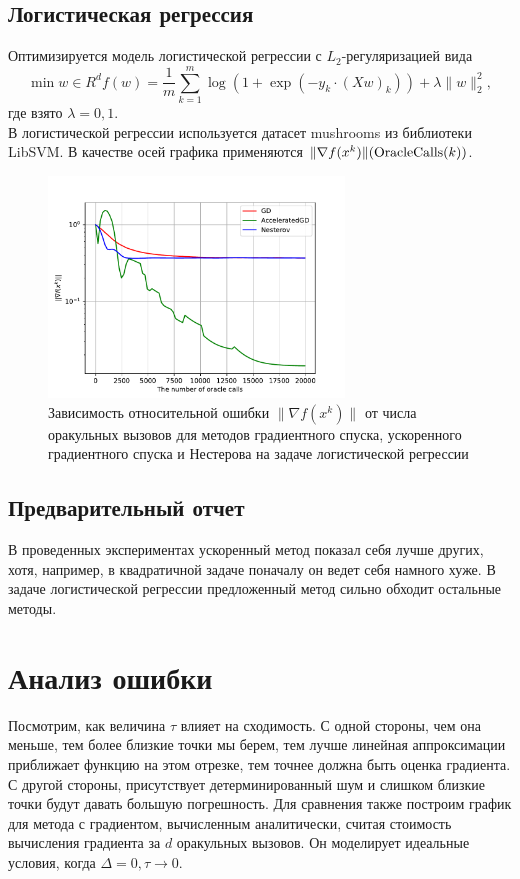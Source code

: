 \documentclass{article}
\begin{document}
\subsection{Логистическая регрессия}
Оптимизируется модель логистической регрессии с $L_2$-регуляризацией вида
\begin{equation}
 \min\limits{w \in R^d} f(w) = \frac{1}{m}\sum\limits_{k = 1}^m \log(1 + \exp(-y_k \cdot (Xw)_k)) + \lambda \|w\|_2^2,
\end{equation}
где взято $\lambda = 0,1$.\\
В логистической регрессии используется датасет mushrooms из библиотеки LibSVM. В качестве осей графика применяются $\|\nabla f(x^k)\| (\textnormal{OracleCalls}(k))$.
\begin{figure}[!htbp]
\centering
  \includegraphics[width=0.7\textwidth]{../figures/Non_stochastic_Logreg_GD_AGD_Nesterov_15_1e-07_1e-05.pdf}
 \caption{Зависимость относительной ошибки $\|\nabla f(x^k)\|$ от числа оракульных вызовов для методов градиентного спуска, ускоренного градиентного спуска и Нестерова на задаче логистической регрессии}
  \label{fig:non-stochastic_logreg}
\end{figure}
\subsection{Предварительный отчет}
В проведенных экспериментах ускоренный метод показал себя лучше других, хотя, например, в квадратичной задаче поначалу он ведет себя намного хуже. В задаче логистической регрессии предложенный метод сильно обходит остальные методы.
\section{Анализ ошибки}
Посмотрим, как величина $\tau$ влияет на сходимость. С одной стороны, чем она меньше, тем более близкие точки мы берем, тем лучше линейная аппроксимации приближает функцию на этом отрезке, тем точнее должна быть оценка градиента. С другой стороны, присутствует детерминированный шум и слишком близкие точки будут давать большую погрешность. Для сравнения также построим график для метода с градиентом, вычисленным аналитически, считая стоимость вычисления градиента за $d$ оракульных вызовов. Он моделирует идеальные условия, когда $\Delta = 0, \tau \to 0$.
\end{document}
